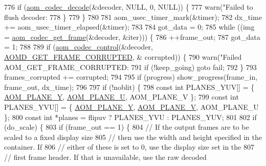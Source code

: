 \begin{DoxyCodeInclude}
{{{{{{{{{{{{{{{{{{{{{{{{{{{{{{{{{{{{{{{{{{{776       \textcolor{keywordflow}{if} (\hyperlink{group__decoder_gab03fdb999d1f83a5896869a3ba5f68f7}{aom\_codec\_decode}(&decoder, NULL, 0, NULL)) \{
777         warn(\textcolor{stringliteral}{"Failed to flush decoder: %
778       \}
779     \}
780 
781     aom\_usec\_timer\_mark(&timer);
782     dx\_time += aom\_usec\_timer\_elapsed(&timer);
783 
784     got\_data = 0;
785     \textcolor{keywordflow}{while} ((img = \hyperlink{group__decoder_ga780aad27a2728abefab725faa3bc4f79}{aom\_codec\_get\_frame}(&decoder, &iter))) \{
786       ++frame\_out;
787       got\_data = 1;
788 
789       \textcolor{keywordflow}{if} (\hyperlink{group__codec_ga6da974f4eeaba1fa74106b28d0fe6ac5}{aom\_codec\_control}(&decoder, \hyperlink{group__aom__decoder_gga3865fd4b3192489baa9a5c3632ebe97ba159ddb748cb69956226b7c13e3890ff6}{AOMD\_GET\_FRAME\_CORRUPTED}, &
      corrupted)) \{
790         warn(\textcolor{stringliteral}{"Failed AOM\_GET\_FRAME\_CORRUPTED: %
791         \textcolor{keywordflow}{if} (!keep\_going) \textcolor{keywordflow}{goto} fail;
792       \}
793       frames\_corrupted += corrupted;
794 
795       \textcolor{keywordflow}{if} (progress) show\_progress(frame\_in, frame\_out, dx\_time);
796 
797       \textcolor{keywordflow}{if} (!noblit) \{
798         \textcolor{keyword}{const} \textcolor{keywordtype}{int} PLANES\_YUV[] = \{ \hyperlink{aom__image_8h_a2ad22076006b15cf809edcaa33f6d339}{AOM\_PLANE\_Y}, \hyperlink{aom__image_8h_a0845e9194541329c0f77b4bd6a38cc7c}{AOM\_PLANE\_U}, AOM\_PLANE\_V \};
799         \textcolor{keyword}{const} \textcolor{keywordtype}{int} PLANES\_YVU[] = \{ \hyperlink{aom__image_8h_a2ad22076006b15cf809edcaa33f6d339}{AOM\_PLANE\_Y}, \hyperlink{aom__image_8h_a32a43f20adb01d846af1925189c37495}{AOM\_PLANE\_V}, AOM\_PLANE\_U \};
800         \textcolor{keyword}{const} \textcolor{keywordtype}{int} *planes = flipuv ? PLANES\_YVU : PLANES\_YUV;
801 
802         \textcolor{keywordflow}{if} (do\_scale) \{
803           \textcolor{keywordflow}{if} (frame\_out == 1) \{
804             \textcolor{comment}{// If the output frames are to be scaled to a fixed display size}
805             \textcolor{comment}{// then use the width and height specified in the container. If}
806             \textcolor{comment}{// either of these is set to 0, use the display size set in the}
807             \textcolor{comment}{// first frame header. If that is unavailable, use the raw decoded}
}}}}}}}}}}}}}}}}}}}}}}}}}}}}}}}}}}}}}}}}}}}}}
\end{DoxyCodeInclude}
